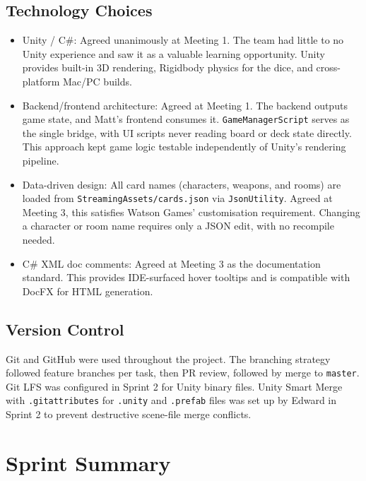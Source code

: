 \subsection{Technology Choices}
\begin{itemize}
    \item Unity / C\#: Agreed unanimously at Meeting 1. The team had little to no Unity experience and saw it as a valuable learning opportunity. Unity provides built-in 3D rendering, Rigidbody physics for the dice, and cross-platform Mac/PC builds.
    \item Backend/frontend architecture: Agreed at Meeting 1. The backend outputs game state, and Matt's frontend consumes it. \texttt{GameManagerScript} serves as the single bridge, with UI scripts never reading board or deck state directly. This approach kept game logic testable independently of Unity's rendering pipeline.
    \item Data-driven design: All card names (characters, weapons, and rooms) are loaded from \texttt{StreamingAssets/cards.json} via \texttt{JsonUtility}. Agreed at Meeting 3, this satisfies Watson Games' customisation requirement. Changing a character or room name requires only a JSON edit, with no recompile needed.
    \item C\# XML doc comments: Agreed at Meeting 3 as the documentation standard. This provides IDE-surfaced hover tooltips and is compatible with DocFX for HTML generation.
\end{itemize}

\subsection{Version Control}
Git and GitHub were used throughout the project. The branching strategy followed feature branches per task, then PR review, followed by merge to \texttt{master}. Git LFS was configured in Sprint 2 for Unity binary files. Unity Smart Merge with \texttt{.gitattributes} for \texttt{.unity} and \texttt{.prefab} files was set up by Edward in Sprint 2 to prevent destructive scene-file merge conflicts.

\section{Sprint Summary}

